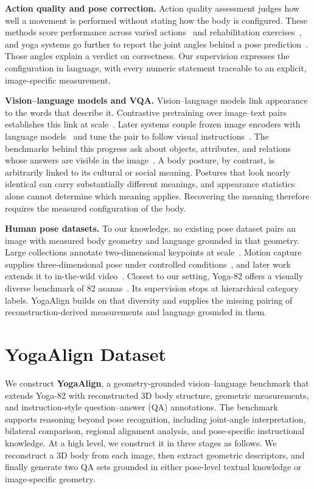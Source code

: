 \documentclass[conference]{IEEEtran}
\begin{document}
\noindent\textbf{Action quality and pose correction.}
Action quality assessment judges how well a movement is performed without stating how the body is configured.
These methods score performance across varied actions~\cite{lei2019survey,parmar2019action} and rehabilitation exercises~\cite{liao2020deep}, and yoga systems go further to report the joint angles behind a pose prediction~\cite{dittakavi2022posetutor}.
Those angles explain a verdict on correctness.
Our supervision expresses the configuration in language, with every numeric statement traceable to an explicit, image-specific measurement.

\noindent\textbf{Vision--language models and VQA.}
Vision--language models link appearance to the words that describe it.
Contrastive pretraining over image--text pairs establishes this link at scale~\cite{radford2021clip}.
Later systems couple frozen image encoders with language models~\cite{alayrac2022flamingo,li2023blip2} and tune the pair to follow visual instructions~\cite{liu2023visual,dai2023instructblip,wang2024qwen2vl}.
The benchmarks behind this progress ask about objects, attributes, and relations whose answers are visible in the image~\cite{goyal2017vqav2,hudson2019gqa}.
A body posture, by contrast, is arbitrarily linked to its cultural or social meaning.
Postures that look nearly identical can carry substantially different meanings, and appearance statistics alone cannot determine which meaning applies.
Recovering the meaning therefore requires the measured configuration of the body.

\noindent\textbf{Human pose datasets.}
To our knowledge, no existing pose dataset pairs an image with measured body geometry and language grounded in that geometry.
Large collections annotate two-dimensional keypoints at scale~\cite{lin2014coco,andriluka2014mpii}.
Motion capture supplies three-dimensional pose under controlled conditions~\cite{ionescu2014human36m}, and later work extends it to in-the-wild video~\cite{vonMarcard2018}.
Closest to our setting, Yoga-82 offers a visually diverse benchmark of 82 asanas~\cite{verma2020yoga82}.
Its supervision stops at hierarchical category labels.
YogaAlign builds on that diversity and supplies the missing pairing of reconstruction-derived measurements and language grounded in them.
\section{YogaAlign Dataset}
\label{sec:dataset}

We construct \textbf{YogaAlign}, a geometry-grounded vision--language benchmark that extends Yoga-82 with reconstructed 3D body structure, geometric measurements, and instruction-style question--answer (QA) annotations.
The benchmark supports reasoning beyond pose recognition, including joint-angle interpretation, bilateral comparison, regional alignment analysis, and pose-specific instructional knowledge.
At a high level, we construct it in three stages as follows.
We reconstruct a 3D body from each image, then extract geometric descriptors, and finally generate two QA sets grounded in either pose-level textual knowledge or image-specific geometry.
\end{document}
